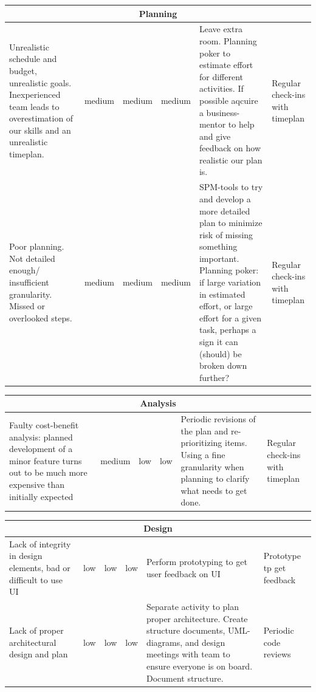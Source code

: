 \documentclass[titlepage]{article}
\begin{document}
 \begin{center}
 \begin{tabular}{|p{3cm}|p{2cm}|p{2cm}|p{2cm}|p{2cm}|p{2cm}|}
 \hline
 \multicolumn{6}{|c|}{Planning} \\
 \hline
 Unrealistic schedule and budget, unrealistic goals. Inexperienced team leads to overestimation of our skills and an unrealistic timeplan. & medium & medium & medium & Leave extra room. Planning poker to estimate effort for different activities. If possible aqcuire a business-mentor to help and give feedback on how realistic our plan is. & Regular check-ins with timeplan \\
 \hline
 Poor planning. Not detailed enough/ insufficient granularity. Missed or overlooked steps. & medium & medium & medium & SPM-tools to try and develop a more detailed plan to minimize risk of missing something important. Planning poker: if large variation in estimated effort, or large effort for a given task, perhaps a sign it can (should) be broken down further? & Regular check-ins with timeplan \\
 \hline
 \end{tabular}
 \end{center}



\begin{center}
 \begin{tabular}{|p{3cm}|p{2cm}|p{2cm}|p{2cm}|p{2cm}|p{2cm}|}
 \hline
 \multicolumn{6}{|c|}{Analysis} \\
 \hline
 Faulty cost-benefit analysis: planned development of a minor feature turns out to be much more expensive than initially expected & medium & low & low & Periodic revisions of the plan and re-prioritizing items. Using a fine granularity when planning to clarify what needs to get done. & Regular check-ins with timeplan \\
 \hline
 \end{tabular}
 \end{center}

 \begin{center}
 \begin{tabular}{|p{3cm}|p{2cm}|p{2cm}|p{2cm}|p{2cm}|p{2cm}|}
 \hline
 \multicolumn{6}{|c|}{Design} \\
 \hline
 Lack of integrity in design elements, bad or difficult to use UI & low & low & low & Perform prototyping to get user feedback on UI & Prototype tp get feedback \\
 \hline
 Lack of proper architectural design and plan & low & low & low & Separate activity to plan proper architecture. Create structure documents, UML-diagrams, and design meetings with team to ensure everyone is on board. Document structure. & Periodic code reviews \\
 \hline
 \end{tabular}
 \end{center}
\end{document}
